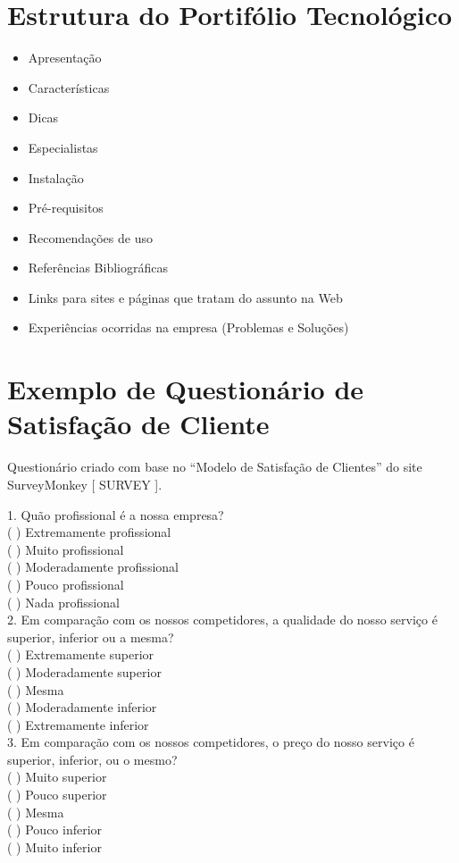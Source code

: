 \begin{apendicesenv}


\chapter{Estrutura do Portifólio Tecnológico}
\begin{itemize}
\item Apresentação
\item Características
\item Dicas
\item Especialistas
\item Instalação
\item Pré-requisitos
\item Recomendações de uso
\item Referências Bibliográficas
\item Links para sites e páginas que tratam do assunto na Web
\item Experiências ocorridas na empresa (Problemas e Soluções)
\end{itemize}

\chapter{Exemplo de Questionário de Satisfação de Cliente}
Questionário   criado   com   base   no   “Modelo   de   Satisfação   de   Clientes”   do   site   SurveyMonkey  
[ SURVEY ].  

1. Quão profissional é a nossa empresa? \\
( ) Extremamente profissional \\
( ) Muito profissional \\
( ) Moderadamente profissional \\
( ) Pouco profissional \\
( ) Nada profissional \\

2. Em comparação com os nossos competidores, a qualidade do nosso serviço é superior, inferior ou a 
mesma? \\
( ) Extremamente superior \\
( ) Moderadamente superior \\
( ) Mesma \\
( ) Moderadamente inferior \\
( ) Extremamente inferior \\
 
3. Em comparação com os nossos competidores, o preço do nosso serviço é superior, inferior, ou o 
mesmo? \\
( ) Muito superior \\
( ) Pouco superior \\
( ) Mesma \\
( ) Pouco inferior \\
( ) Muito inferior \\
 

\end{apendicesenv}

